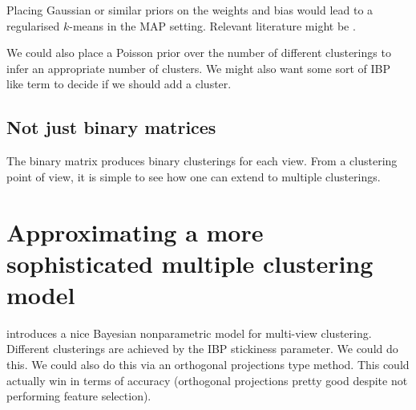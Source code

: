 \documentclass{article}
\numberwithin{equation}{section}
\numberwithin{thm}{section}
\begin{document}
Placing Gaussian or similar priors on the weights and bias would lead to a regularised $k$-means in the MAP setting.
Relevant literature might be \cite{Sun2012}.

We could also place a Poisson prior over the number of different clusterings to infer an appropriate number of clusters.
We might also want some sort of IBP like term to decide if we should add a cluster.

\subsection{Not just binary matrices}

The binary matrix produces binary clusterings for each view.
From a clustering point of view, it is simple to see how one can extend to multiple clusterings.

\section{Approximating a more sophisticated multiple clustering model}

\citep{Niu2012} introduces a nice Bayesian nonparametric model for multi-view clustering.
Different clusterings are achieved by the IBP stickiness parameter.
We could do this.
We could also do this via an orthogonal projections type method.
This could actually win in terms of accuracy (orthogonal projections pretty good despite not performing feature selection).


\small{

%

}
\end{document}
